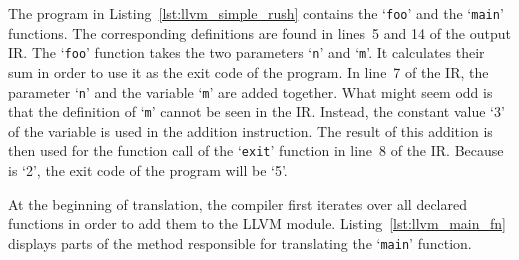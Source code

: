 \noindent
\begin{minipage}{.44\textwidth}
    \centering
\end{minipage}%
\hfill
\begin{minipage}{.44\textwidth}
    \centering
    \vspace{.1cm}
\end{minipage}

The program in Listing~\ref{lst:llvm_simple_rush} contains the `\texttt{foo}' and the `\texttt{main}' functions.
The corresponding definitions are found in lines~5 and 14 of the output IR.
The `\texttt{foo}' function takes the two parameters `\texttt{n}' and `\texttt{m}'.
It calculates their sum in order to use it as the exit code of the program.
In line~7 of the IR, the parameter `\texttt{n}' and the variable `\texttt{m}' are added together.
What might seem odd is that the definition of `\texttt{m}' cannot be seen in the IR\@.
Instead, the constant value `3' of the variable is used in the addition instruction.
The result of this addition is then used for the function call of the `\texttt{exit}' function in line~8 of the IR\@.
Because  is `2', the exit code of the program will be `5'.

At the beginning of translation, the compiler first iterates over all declared functions in order to add them to the LLVM module.
Listing~\ref{lst:llvm_main_fn} displays parts of the method responsible for translating the `\texttt{main}' function.


